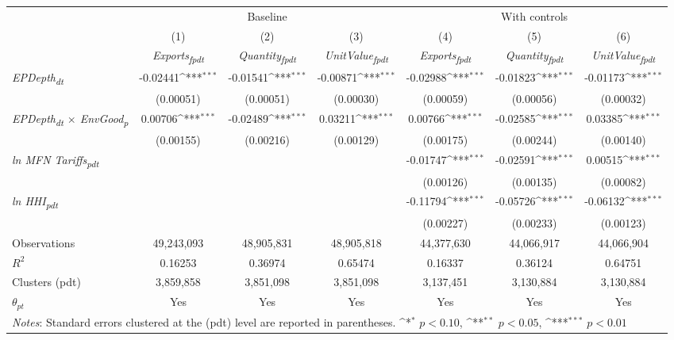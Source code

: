 {
\def\sym#1{\ifmmode^{#1}\else\(^{#1}\)\fi}
\begin{tabular}{l*{6}{c}}
\toprule
&\multicolumn{3}{c}{Baseline}&\multicolumn{3}{c}{With controls}\\\cmidrule(lr){2-4}\cmidrule(lr){5-7}
&(1)&(2)&(3)&(4)&(5)&(6)\\
&\textit{Exports\textsubscript{fpdt}}&\textit{Quantity\textsubscript{fpdt}}&\textit{UnitValue\textsubscript{fpdt}}&\textit{Exports\textsubscript{fpdt}}&\textit{Quantity\textsubscript{fpdt}}&\textit{UnitValue\textsubscript{fpdt}}\\
\midrule
\textit{EPDepth\textsubscript{dt}} & -0.02441\sym{***} & -0.01541\sym{***} & -0.00871\sym{***} & -0.02988\sym{***} & -0.01823\sym{***} & -0.01173\sym{***}\\
 & (0.00051) & (0.00051) & (0.00030) & (0.00059) & (0.00056) & (0.00032)\\
\addlinespace
\textit{EPDepth\textsubscript{dt} $\times$ EnvGood\textsubscript{p}} & 0.00706\sym{***} & -0.02489\sym{***} & 0.03211\sym{***} & 0.00766\sym{***} & -0.02585\sym{***} & 0.03385\sym{***}\\
 & (0.00155) & (0.00216) & (0.00129) & (0.00175) & (0.00244) & (0.00140)\\
\addlinespace
\textit{ln MFN Tariffs\textsubscript{pdt}} &  &  &  & -0.01747\sym{***} & -0.02591\sym{***} & 0.00515\sym{***}\\
 &  &  &  & (0.00126) & (0.00135) & (0.00082)\\
\addlinespace
\textit{ln HHI\textsubscript{pdt}} &  &  &  & -0.11794\sym{***} & -0.05726\sym{***} & -0.06132\sym{***}\\
 &  &  &  & (0.00227) & (0.00233) & (0.00123)\\
\midrule
Observations & 49,243,093 & 48,905,831 & 48,905,818 & 44,377,630 & 44,066,917 & 44,066,904\\
$R^{2}$ & 0.16253 & 0.36974 & 0.65474 & 0.16337 & 0.36124 & 0.64751\\
Clusters (pdt) & 3,859,858 & 3,851,098 & 3,851,098 & 3,137,451 & 3,130,884 & 3,130,884\\
$\theta_{pt}$ & Yes & Yes & Yes & Yes & Yes & Yes\\
\bottomrule
\multicolumn{7}{l}{\footnotesize \textit{Notes}: Standard errors clustered at the (pdt) level are reported in parentheses. \sym{*} \(p<0.10\), \sym{**} \(p<0.05\), \sym{***} \(p<0.01\)}\\
\end{tabular}
}
